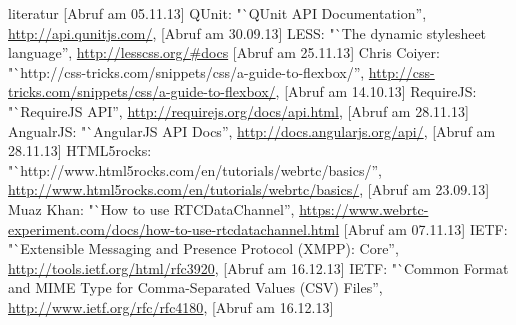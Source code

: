\begin{thebibliography}{literatur}
		[Abruf am 05.11.13]
	 QUnit: %
		"`QUnit API Documentation'',
		\hyperlink{http://api.qunitjs.com/}{http://api.qunitjs.com/},
		[Abruf am 30.09.13]
	 LESS:
		"`The dynamic stylesheet language'',
		\hyperlink{http://lesscss.org/\#docs}{http://lesscss.org/\#docs}
		[Abruf am 25.11.13]
	 Chris Coiyer:
		"`http://css-tricks.com/snippets/css/a-guide-to-flexbox/'',
		\hyperlink{http://css-tricks.com/snippets/css/a-guide-to-flexbox/}{http://css-tricks.com/snippets/css/a-guide-to-flexbox/},
		[Abruf am 14.10.13]
	 RequireJS:
		"`RequireJS API'',
		\hyperlink{http://requirejs.org/docs/api.html}{http://requirejs.org/docs/api.html},
		[Abruf am 28.11.13]
	 AngualrJS:
		"`AngularJS API Docs'',
		\hyperlink{http://docs.angularjs.org/api/}{http://docs.angularjs.org/api/},
		[Abruf am 28.11.13]
	 HTML5rocks:
		"`http://www.html5rocks.com/en/tutorials/webrtc/basics/'',
		\hyperlink{http://www.html5rocks.com/en/tutorials/webrtc/basics/}{http://www.html5rocks.com/en/tutorials/webrtc/basics/},
		[Abruf am 23.09.13]
	 Muaz Khan:
		"`How to use RTCDataChannel'',
		\hyperlink{https://www.webrtc-experiment.com/docs/how-to-use-rtcdatachannel.html}{https://www.webrtc-experiment.com/docs/how-to-use-rtcdatachannel.html}
		[Abruf am 07.11.13]
	 IETF:
		"`Extensible Messaging and Presence Protocol (XMPP): Core'',
		\hyperlink{http://tools.ietf.org/html/rfc3920}{http://tools.ietf.org/html/rfc3920},
		[Abruf am 16.12.13]
	 IETF:
		"`Common Format and MIME Type for Comma-Separated Values (CSV) Files'',
		\hyperlink{http://www.ietf.org/rfc/rfc4180}{http://www.ietf.org/rfc/rfc4180},
		[Abruf am 16.12.13]
\end{thebibliography}


\appendix





















